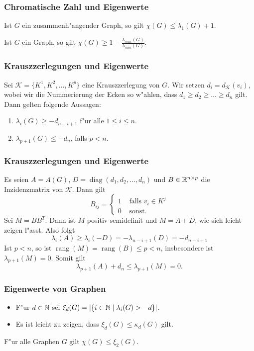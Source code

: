 \documentclass{beamer}
\begin{document}
\begin{frame}
  \frametitle{Chromatische Zahl und Eigenwerte}
  \begin{theorem}[Wilf]
    Ist $G$ ein zusammenh"angender Graph, so gilt $\chi(G) \leq \lambda_{1}(G) +1$.
  \end{theorem}
  \begin{theorem}[Hoffman]
    Ist $G$ ein Graph, so gilt $\chi(G) \geq 1- \frac{\lambda_{max}(G)}{\lambda_{min}(G)}$.
  \end{theorem}
\end{frame}
\begin{frame}[<+->]
  \frametitle{Krauszzerlegungen und Eigenwerte}
  \begin{theorem}
    Sei $\mathcal{K} = \{K^{1}, K^{2}, \dots , K^{p} \}$ eine Krauszzerlegung von $G$. Wir setzen $d_i = d_{\mathcal{K}}(v_i)$, wobei wir die Nummerierung der Ecken so w"ahlen, dass $d_1 \geq d_2 \geq \dots \geq d_n$ gilt.
    Dann gelten folgende Aussagen:
    \begin{enumerate}
      \item $\lambda_{i}(G) \geq -d_{n-i+1}$ f"ur alle $1 \leq i \leq n$. 
      \item $\lambda_{p+1}(G) \leq -d_n$, falls $p< n$.
    \end{enumerate}
  \end{theorem}
\end{frame}
\begin{frame}[<+->]
  \frametitle{Krauszzerlegungen und Eigenwerte}

  Es seien $A= A(G)$, $D= \operatorname{diag}(d_1,d_2,\dots,d_n)$ und $B\in{\mathbb{R}}^{n\times p}$ die Inzidenzmatrix von $\mathcal{K}$. Dann gilt
  $$ B_{ij} = \begin{cases}
    1 & \text{ falls } v_i\in K^{j} \\
    0 & \text{ sonst.} 
  \end{cases} $$
  \pause
  Sei $M=BB^{T}$. Dann ist $M$ positiv semidefinit und $M=A+D$, wie sich leicht zeigen l"asst. \pause Also folgt 
  $$\lambda_{i}(A) \geq \lambda_{i}(-D) = -\lambda_{n-i+1}(D) = -d_{n-i+1}$$
  \pause
  Ist $p < n$, so ist $\operatorname{rang}(M) = \operatorname{rang} (B) \leq p < n$, insbesondere ist $\lambda_{p+1}(M) = 0$. 
  \pause
  Somit gilt
  $$\lambda_{p+1}(A) + d_n \leq \lambda_{p+1}(M) = 0. $$
\end{frame}

\begin{frame}[<+->]
  \frametitle{Eigenwerte von Graphen}
  \begin{itemize}[<+->]
    \item F"ur $d\in {\mathbb{N}}$ sei $\xi_{d}(G) = | \{i \in {\mathbb{N}} \;|\; \lambda_{i}(G) > -d \}|$.
    \item Es ist leicht zu zeigen, dass $\xi_{d}(G) \leq \kappa_{d}(G)$ gilt.
  \end{itemize}
  \begin{conjecture}
    F"ur alle Graphen $G$ gilt $\chi(G) \leq \xi_{2}(G)$.
  \end{conjecture}
\end{frame}
\end{document}
